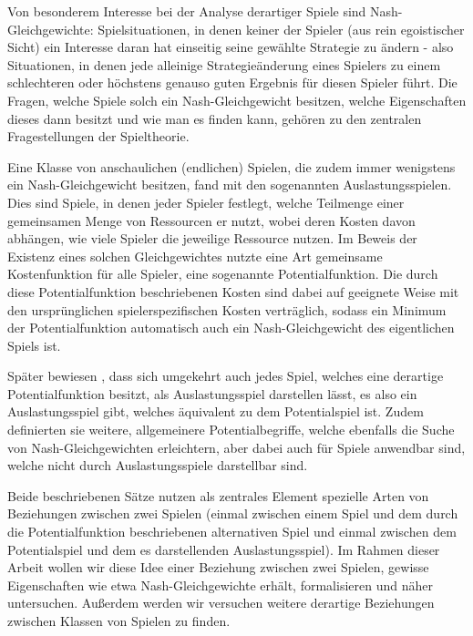 \documentclass[a4paper,ngerman,11pt,bibliography=totoc]{scrartcl}
\theoremstyle{definition}
\theoremstyle{plain}
\theoremstyle{remark}
\begin{document}
Von besonderem Interesse bei der Analyse derartiger Spiele sind Nash-Gleichgewichte: Spielsituationen, in denen keiner der Spieler (aus rein egoistischer Sicht) ein Interesse daran hat einseitig seine gewählte Strategie zu ändern - also Situationen, in denen jede alleinige Strategieänderung eines Spielers zu einem schlechteren oder höchstens genauso guten Ergebnis für diesen Spieler führt. Die Fragen, welche Spiele solch ein Nash-Gleichgewicht besitzen, welche Eigenschaften dieses dann besitzt und wie man es finden kann, gehören zu den zentralen Fragestellungen der Spieltheorie.

Eine Klasse von anschaulichen (endlichen) Spielen, die zudem immer wenigstens ein Nash-Gleichgewicht besitzen, fand \citeauthor{RosenthalPotential} mit den sogenannten Auslastungsspielen. Dies sind Spiele, in denen jeder Spieler festlegt, welche Teilmenge einer gemeinsamen Menge von Ressourcen er nutzt, wobei deren Kosten davon abhängen, wie viele Spieler die jeweilige Ressource nutzen. Im Beweis der Existenz eines solchen Gleichgewichtes nutzte \citeauthor{RosenthalPotential} eine Art gemeinsame Kostenfunktion für alle Spieler, eine sogenannte Potentialfunktion. Die durch diese Potentialfunktion beschriebenen Kosten sind dabei auf geeignete Weise mit den ursprünglichen spielerspezifischen Kosten verträglich, sodass ein Minimum der Potentialfunktion automatisch auch ein Nash-Gleichgewicht des eigentlichen Spiels ist.

Später bewiesen \citeauthor{MonShap}, dass sich umgekehrt auch jedes Spiel, welches eine derartige Potentialfunktion besitzt, als Auslastungsspiel darstellen lässt, es also ein Auslastungsspiel gibt, welches äquivalent zu dem Potentialspiel ist. Zudem definierten sie weitere, allgemeinere Potentialbegriffe, welche ebenfalls die Suche von Nash-Gleichgewichten erleichtern, aber dabei auch für Spiele anwendbar sind, welche nicht durch Auslastungsspiele darstellbar sind. 

Beide beschriebenen Sätze nutzen als zentrales Element spezielle Arten von Beziehungen zwischen zwei Spielen (einmal zwischen einem Spiel und dem durch die Potentialfunktion beschriebenen alternativen Spiel und einmal zwischen dem Potentialspiel und dem es darstellenden Auslastungsspiel). Im Rahmen dieser Arbeit wollen wir diese Idee einer Beziehung zwischen zwei Spielen, gewisse Eigenschaften wie etwa Nash-Gleichgewichte erhält, formalisieren und näher untersuchen. Außerdem werden wir versuchen weitere derartige Beziehungen zwischen Klassen von Spielen zu finden.
\end{document}
